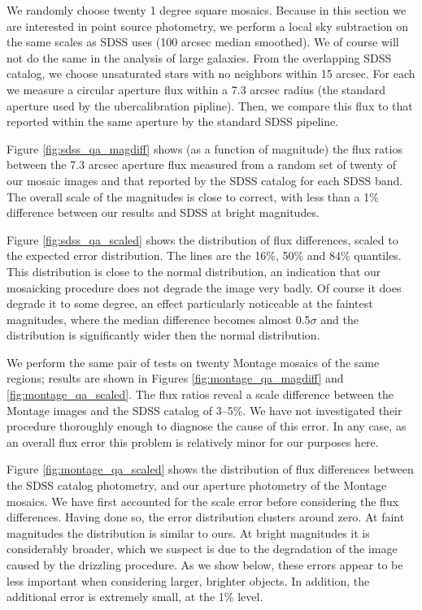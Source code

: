 \documentclass[10pt,preprint]{aastex}
\begin{document}
We randomly choose twenty 1 degree square mosaics. Because in this
section we are interested in point source photometry, we perform a
local sky subtraction on the same scales as SDSS uses (100 arcsec
median smoothed).  We of course will not do the same in the analysis
of large galaxies. From the overlapping SDSS catalog, we choose
unsaturated stars with no neighbors within 15 arcsec.  For each we
measure a circular aperture flux within a 7.3 arcsec radius (the
standard aperture used by the ubercalibration pipline).  Then, we
compare this flux to that reported within the same aperture by the
standard SDSS pipeline.

Figure \ref{fig:sdss_qa_magdiff} shows (as a function of magnitude)
the flux ratios between the 7.3 arcsec aperture flux measured from a
random set of twenty of our mosaic images and that reported by the
SDSS catalog for each SDSS band. The overall scale of the magnitudes
is close to correct, with less than a 1\% difference between our
results and SDSS at bright magnitudes.

Figure \ref{fig:sdss_qa_scaled} shows the distribution of flux
differences, scaled to the expected error distribution. The lines are
the 16\%, 50\% and 84\% quantiles. This distribution is close to the
normal distribution, an indication that our mosaicking procedure does
not degrade the image very badly.  Of course it does degrade it to
some degree, an effect particularly noticeable at the faintest
magnitudes, where the median difference becomes almost 0.5$\sigma$ and
the distribution is significantly wider then the normal distribution.

We perform the same pair of tests on twenty Montage mosaics of the
same regions; results are shown in Figures
\ref{fig:montage_qa_magdiff} and \ref{fig:montage_qa_scaled}.  The
flux ratios reveal a scale difference between the Montage
images and the SDSS catalog of 3--5\%.
We have not investigated their procedure thoroughly enough to diagnose
the cause of this error.  In any case, as an overall flux error this
problem is relatively minor for our purposes here.

Figure \ref{fig:montage_qa_scaled} shows the distribution of flux
differences between the SDSS catalog photometry, and our aperture
photometry of the Montage mosaics. We have first accounted for the
scale error before considering the flux differences. Having done so,
the error distribution clusters around zero.  At faint magnitudes the
distribution is similar to ours. At bright magnitudes it is
considerably broader, which we suspect is due to the degradation of
the image caused by the drizzling procedure. As we show below, these
errors appear to be less important when considering larger, brighter
objects. In addition, the additional error is extremely small, at the
1\% level.
\end{document}
